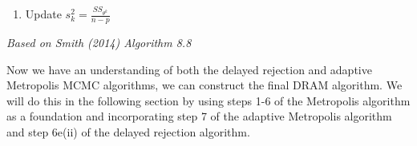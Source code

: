 \documentclass{article}
\begin{document}
\begin{tcolorbox}
\begin{enumerate}
\begin{enumerate}
\begin{enumerate}
        \end{enumerate}
        \item Update $s_k^2 = \frac{SS_{\theta^k}}{n-p}$
    \end{enumerate}
\end{enumerate}
\emph{Based on Smith (2014) Algorithm 8.8}
\end{tcolorbox}
\par Now we have an understanding of both the delayed rejection and adaptive Metropolis MCMC algorithms, we can construct the final DRAM algorithm. We will do this in the following section by using steps 1-6 of the Metropolis algorithm as a foundation and incorporating step 7 of the adaptive Metropolis algorithm and step 6e(ii) of the delayed rejection algorithm.
\end{document}
